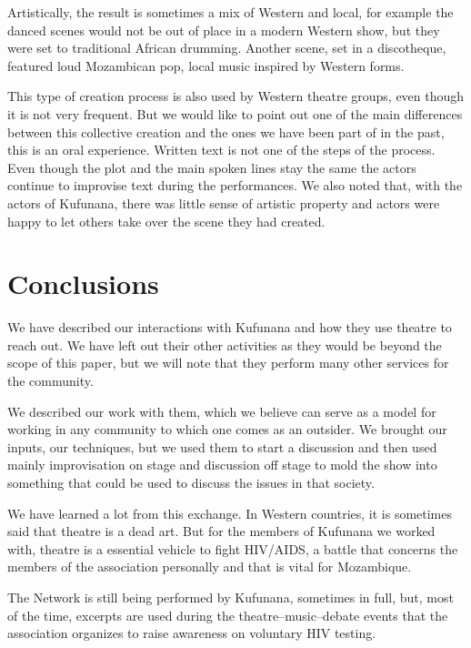 \documentclass[article,twocolumn]{memoir}
\begin{document}
Artistically, the result is sometimes a mix of Western and local, for example
the danced scenes would not be out of place in a modern Western show, but they
were set to traditional African drumming. Another scene, set in a discotheque,
featured loud Mozambican pop, local music inspired by Western forms.

This type of creation process is also used by Western theatre groups, even
though it is not very frequent. But we would like to point out one of the main
differences between this collective creation and the ones we have been part of
in the past, this is an oral experience. Written text is not one of the steps of
the process. Even though the plot and the main spoken lines stay the same the
actors continue to improvise text during the performances. We also noted that,
with the actors of Kufunana, there was little sense of artistic property and
actors were happy to let others take over the scene they had created.

\chapter{Conclusions}

We have described our interactions with Kufunana and how they use theatre to
reach out. We have left out their other activities as they would be beyond the
scope of this paper, but we will note that they perform many other services for
the community.

We described our work with them, which we believe can serve as a model for
working in any community to which one comes as an outsider. We brought our
inputs, our techniques, but we used them to start a discussion and then used
mainly improvisation on stage and discussion off stage to mold the show into
something that could be used to discuss the issues in that society.

We have learned a lot from this exchange. In Western countries, it is sometimes
said that theatre is a dead art. But for the members of Kufunana we worked
with, theatre is a essential vehicle to fight HIV/AIDS, a battle that concerns
the members of the association personally and that is vital for Mozambique.

The Network is still being performed by Kufunana, sometimes in full, but, most
of the time, excerpts are used during the theatre--music--debate events that
the association organizes to raise awareness on voluntary HIV testing.
\end{document}
